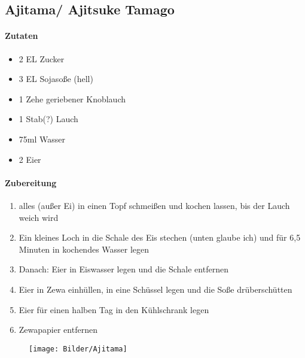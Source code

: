\newpage
\subsection{Ajitama/ Ajitsuke Tamago}
\paragraph{Zutaten}
\begin{itemize}[noitemsep]
	\item 2 EL Zucker
	\item 3 EL Sojasoße (hell)
	\item 1 Zehe geriebener Knoblauch
	\item 1 Stab(?) Lauch
	\item 75ml Wasser 
	\item 2 Eier
\end{itemize}
\paragraph{Zubereitung}
\begin{enumerate}[noitemsep]
	\item alles (außer Ei) in einen Topf schmeißen und kochen lassen, bis der Lauch weich wird 
	\item Ein kleines Loch in die Schale des Eis stechen (unten glaube ich) und für 6,5 Minuten in kochendes Wasser legen 
	\item Danach: Eier in Eiswasser legen und die Schale entfernen
	\item Eier in Zewa einhüllen, in eine Schüssel legen und die Soße drüberschütten
	\item Eier für einen halben Tag in den Kühlschrank legen 
	\item Zewapapier entfernen
\end{enumerate}
\vspace{1cm}
\begin{figure}[h]
\centering
\texttt{[image: Bilder/Ajitama]}
\end{figure}